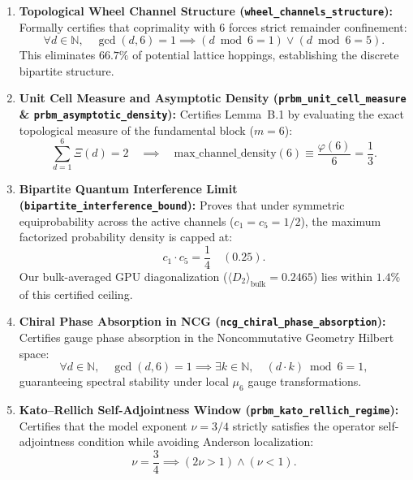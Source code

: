 \documentclass[11pt,a4paper]{article}
\begin{document}
\begin{enumerate}
    \item \textbf{Topological Wheel Channel Structure (\texttt{wheel\_channels\_structure}):}
    Formally certifies that coprimality with 6 forces strict remainder confinement:
    \begin{equation}
    \forall d \in \mathbb{N}, \quad \gcd(d, 6) = 1 \implies (d \bmod 6 = 1) \lor (d \bmod 6 = 5).
    \end{equation}
    This eliminates $66.7\%$ of potential lattice hoppings, establishing the discrete bipartite structure.

    \item \textbf{Unit Cell Measure and Asymptotic Density (\texttt{prbm\_unit\_cell\_measure} \& \texttt{prbm\_asymptotic\_density}):}
    Certifies Lemma~B.1 by evaluating the exact topological measure of the fundamental block ($m=6$):
    \begin{equation}
    \sum_{d=1}^{6} \Xi(d) = 2 \quad \implies \quad \text{max\_channel\_density}(6) \equiv \frac{\varphi(6)}{6} = \frac{1}{3}.
    \end{equation}

    \item \textbf{Bipartite Quantum Interference Limit (\texttt{bipartite\_interference\_bound}):}
    Proves that under symmetric equiprobability across the active channels ($c_1 = c_5 = 1/2$), the maximum factorized probability density is capped at:
    \begin{equation}
    c_1 \cdot c_5 = \frac{1}{4} \quad (0.25).
    \end{equation}
    Our bulk-averaged GPU diagonalization ($\langle D_2 \rangle_{\text{bulk}} = 0.2465$) lies within $1.4\%$ of this certified ceiling.

    \item \textbf{Chiral Phase Absorption in NCG (\texttt{ncg\_chiral\_phase\_absorption}):}
    Certifies gauge phase absorption in the Noncommutative Geometry Hilbert space:
    \begin{equation}
    \forall d \in \mathbb{N}, \quad \gcd(d, 6) = 1 \implies \exists k \in \mathbb{N}, \quad (d \cdot k) \bmod 6 = 1,
    \end{equation}
    guaranteeing spectral stability under local $\mu_6$ gauge transformations.

    \item \textbf{Kato--Rellich Self-Adjointness Window (\texttt{prbm\_kato\_rellich\_regime}):}
    Certifies that the model exponent $\nu = 3/4$ strictly satisfies the operator self-adjointness condition while avoiding Anderson localization:
    \begin{equation}
    \nu = \frac{3}{4} \implies \left(2\nu > 1\right) \land \left(\nu < 1\right).
    \end{equation}
\end{enumerate}
\end{document}
